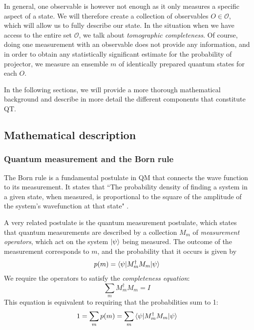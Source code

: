 \documentclass[12pt]{memoir}
\newcommand{\ti}{\textit}
\begin{document}
In general, one observable is however not enough as it only measures a specific aspect of a state. We will therefore create a collection of observables $O \in \mathcal{O}$, which will allow us to fully describe our state. In the situation when we have access to the entire set $\mathcal{O}$, we talk about \ti{tomographic completeness}. Of course, doing one measurement with an observable does not provide any information, and in order to obtain any statistically significant estimate for the probability of projector, we measure an ensemble $m$ of identically prepared quantum states for each $O$. \medbreak

In the following sections, we will provide a more thorough mathematical background and describe in more detail the different components that constitute QT.
\subsection{Mathematical description} \label{background:qt:math}

\subsubsection*{Quantum measurement and the Born rule}
The Born rule is a fundamental postulate in QM that connects the wave function to its measurement. It states that ``The probability density of finding a system in a given state, when measured, is proportional to the square of the amplitude of the system's wavefunction at that state" \cite{wiki:born-rule}.\medbreak

A very related postulate is the quantum measurement postulate, which states that quantum measurements are described by a collection $M_m$ of \textit{measurement operators}, which act on the system $\ket \psi$ being measured. The outcome of the measurement corresponds to $m$, and the probability that it occurs is given by
\begin{equation} \label{eq:quantum-measurement}
    p(m) = \braket{\psi|M_m^\dagger M_m|\psi}
\end{equation}
We require the operators to satisfy the \textit{completeness equation}:
\begin{equation}
    \sum_m M_m^\dagger M_m = I
\end{equation}
This equation is equivalent to requiring that the probabilities sum to 1:
\begin{equation}
    1 = \sum_m p(m) = \sum_m \braket{\psi|M_m^\dagger M_m|\psi}
\end{equation}
\end{document}
